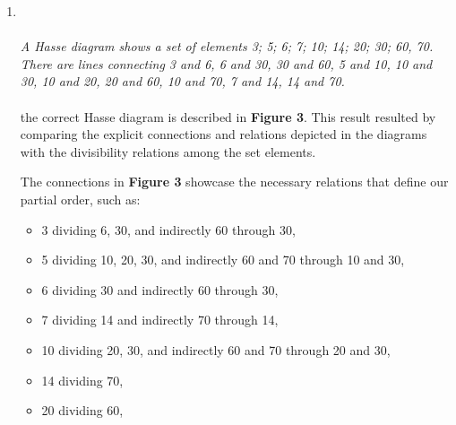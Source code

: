 \documentclass{amsart}
\theoremstyle{definition}
\theoremstyle{Exercise}
\theoremstyle{remark}
\theoremstyle{rule}
\numberwithin{equation}{section}
\begin{document}
\begin{enumerate}[label=(\alph{*})]
		\item {} \\\\
			{\color{blue}{\bf Figure 3:} \emph{A Hasse diagram shows a set of elements {3; 5; 6; 7; 10; 14; 20; 30; 60, 70}. There are lines connecting 3 and 6, 6 and 30, 30 and 60, 5 and 10, 10 and 30, 10 and 20, 20 and 60, 10 and 70, 7 and 14, 14 and 70. } }
			\\ \\
			the correct Hasse diagram is described in \textbf{Figure 3}. This result
			resulted by comparing the explicit connections and relations depicted in
			the diagrams with the divisibility relations among the set elements.

			The connections in \textbf{Figure 3} showcase the necessary relations that
			define our partial order, such as:
			\begin{itemize}
				\item 3 dividing 6, 30, and indirectly 60 through 30,

				\item 5 dividing 10, 20, 30, and indirectly 60 and 70 through 10 and 30,

				\item 6 dividing 30 and indirectly 60 through 30,

				\item 7 dividing 14 and indirectly 70 through 14,

				\item 10 dividing 20, 30, and indirectly 60 and 70 through 20 and 30,

				\item 14 dividing 70,

				\item 20 dividing 60,


\end{itemize}
\end{enumerate}
\end{document}
